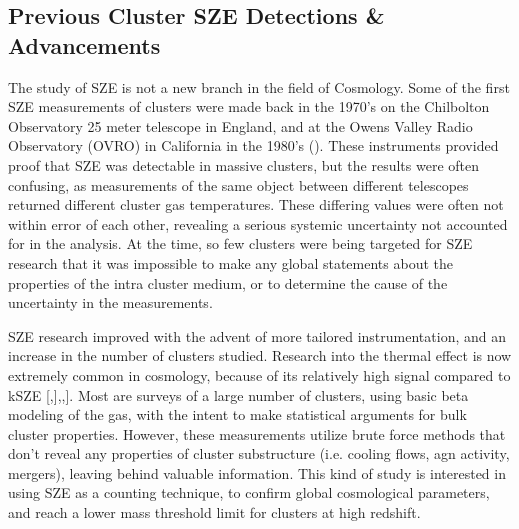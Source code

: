 \documentclass[manuscript]{aastex}
\begin{document}



\subsection{Previous Cluster SZE Detections \& Advancements}

The study of SZE is not a new branch in the field of Cosmology. Some of the first SZE measurements of clusters were made back in the 1970's on the Chilbolton Observatory 25 meter telescope in England, and at the Owens Valley Radio Observatory (OVRO) in California in the 1980's (\cite{Birkinshaw1999}). These instruments provided proof that SZE was detectable in massive clusters, but the results were often confusing, as measurements of the same object between different telescopes returned different cluster gas temperatures. These differing values were often not within error of each other, revealing a serious systemic uncertainty not accounted for in the analysis. At the time, so few clusters were being targeted for SZE research that it was impossible to make any global statements about the properties of the intra cluster medium, or to determine the cause of the uncertainty in the measurements. 

SZE research improved with the advent of more tailored instrumentation, and an increase in the number of clusters studied. Research into the thermal effect is now extremely common in cosmology, because of its relatively high signal compared to kSZE [\cite{Benson2013},\cite{Saliwanchik2015}],\cite{Bleem2015},\cite{Planck2016}]. Most are surveys of a large number of clusters, using basic beta modeling of the gas, with the intent to make statistical arguments for bulk cluster properties. However, these measurements utilize brute force methods that don't reveal any properties of cluster substructure (i.e. cooling flows, agn activity, mergers), leaving behind valuable information. This kind of study is interested in using SZE as a counting technique, to confirm global cosmological parameters, and reach a lower mass threshold limit for clusters at high redshift. 
\end{document}
